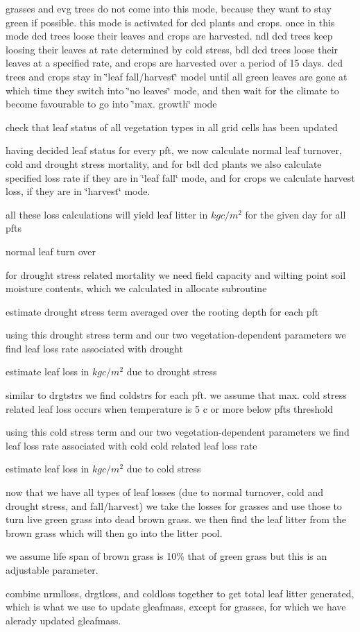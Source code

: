 grasses and evg trees do not come into this mode, because they want to stay green if possible. this mode is activated for dcd plants and crops. once in this mode dcd trees loose their leaves and crops are harvested. ndl dcd trees keep loosing their leaves at rate determined by cold stress, bdl dcd trees loose their leaves at a specified rate, and crops are harvested over a period of 15 days. dcd trees and crops stay in \char`\"{}leaf fall/harvest\char`\"{} model until all green leaves are gone at which time they switch into \char`\"{}no leaves\char`\"{} mode, and then wait for the climate to become favourable to go into \char`\"{}max. growth\char`\"{} mode

check that leaf status of all vegetation types in all grid cells has been updated





having decided leaf status for every pft, we now calculate normal leaf turnover, cold and drought stress mortality, and for bdl dcd plants we also calculate specified loss rate if they are in \char`\"{}leaf fall\char`\"{} mode, and for crops we calculate harvest loss, if they are in \char`\"{}harvest\char`\"{} mode.

all these loss calculations will yield leaf litter in $kg c/m^2$ for the given day for all pfts

normal leaf turn over

for drought stress related mortality we need field capacity and wilting point soil moisture contents, which we calculated in allocate subroutine

estimate drought stress term averaged over the rooting depth for each pft

\begin{DoxyVerb}    using this drought stress term and our two vegetation-dependent
    parameters we find leaf loss rate associated with drought \end{DoxyVerb}


estimate leaf loss in $kg c/m^2$ due to drought stress

similar to drgtstrs we find coldstrs for each pft. we assume that max. cold stress related leaf loss occurs when temperature is 5 c or more below pft\textquotesingle{}s threshold

using this cold stress term and our two vegetation-\/dependent parameters we find leaf loss rate associated with cold cold related leaf loss rate

estimate leaf loss in $kg c/m^2$ due to cold stress

now that we have all types of leaf losses (due to normal turnover, cold and drought stress, and fall/harvest) we take the losses for grasses and use those to turn live green grass into dead brown grass. we then find the leaf litter from the brown grass which will then go into the litter pool.

we assume life span of brown grass is 10\% that of green grass but this is an adjustable parameter.

combine nrmlloss, drgtloss, and coldloss together to get total leaf litter generated, which is what we use to update gleafmass, except for grasses, for which we have alerady updated gleafmass.